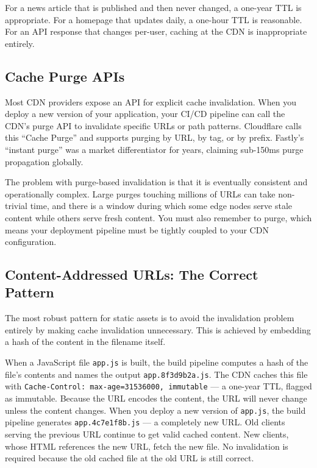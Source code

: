 \documentclass[11pt,a4paper]{article}
\begin{document}
For a news article that is published and then never changed, a one-year TTL is appropriate. For a homepage that updates daily, a one-hour TTL is reasonable. For an API response that changes per-user, caching at the CDN is inappropriate entirely.

\subsection{Cache Purge APIs}

Most CDN providers expose an API for explicit cache invalidation. When you deploy a new version of your application, your CI/CD pipeline can call the CDN's purge API to invalidate specific URLs or path patterns. Cloudflare calls this ``Cache Purge'' and supports purging by URL, by tag, or by prefix. Fastly's ``instant purge'' was a market differentiator for years, claiming sub-150ms purge propagation globally.

The problem with purge-based invalidation is that it is eventually consistent and operationally complex. Large purges touching millions of URLs can take non-trivial time, and there is a window during which some edge nodes serve stale content while others serve fresh content. You must also remember to purge, which means your deployment pipeline must be tightly coupled to your CDN configuration.

\subsection{Content-Addressed URLs: The Correct Pattern}

The most robust pattern for static assets is to avoid the invalidation problem entirely by making cache invalidation unnecessary. This is achieved by embedding a hash of the content in the filename itself.

When a JavaScript file \texttt{app.js} is built, the build pipeline computes a hash of the file's contents and names the output \texttt{app.8f3d9b2a.js}. The CDN caches this file with \texttt{Cache-Control: max-age=31536000, immutable} --- a one-year TTL, flagged as immutable. Because the URL encodes the content, the URL will never change unless the content changes. When you deploy a new version of \texttt{app.js}, the build pipeline generates \texttt{app.4c7e1f8b.js} --- a completely new URL. Old clients serving the previous URL continue to get valid cached content. New clients, whose HTML references the new URL, fetch the new file. No invalidation is required because the old cached file at the old URL is still correct.
\end{document}
